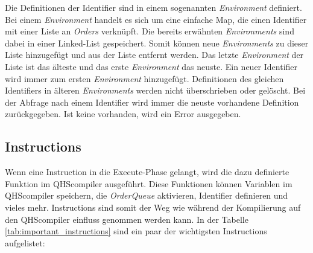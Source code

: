 Die Definitionen der Identifier sind in einem sogenannten \textit{Environment} definiert.
Bei einem \textit{Environment} handelt es sich um eine einfache Map, die einen Identifier mit einer Liste an \textit{Orders} verknüpft.
Die bereits erwähnten \textit{Environments} sind dabei in einer Linked-List gespeichert. Somit können neue \textit{Environments} zu dieser Liste hinzugefügt und aus der Liste entfernt werden.
Das letzte \textit{Environment} der Liste ist das älteste und das erste \textit{Environment} das neuste.
Ein neuer Identifier wird immer zum ersten \textit{Environment} hinzugefügt. Definitionen des gleichen Identifiers in älteren \textit{Environments} werden nicht überschrieben oder gelöscht.
Bei der Abfrage nach einem Identifier wird immer die neuste vorhandene Definition zurückgegeben. Ist keine vorhanden, wird ein Error ausgegeben.

\subsection{Instructions}
Wenn eine Instruction in die Execute-Phase gelangt, wird die dazu definierte Funktion im QHScompiler ausgeführt.
Diese Funktionen können Variablen im QHScompiler speichern, die \textit{OrderQueue} aktivieren, Identifier definieren und vieles mehr. Instructions sind somit der Weg wie während der Kompilierung auf den QHScompiler einfluss genommen werden kann.
In der Tabelle \ref{tab:important_instructions} sind ein paar der wichtigsten Instructions aufgelistet:


